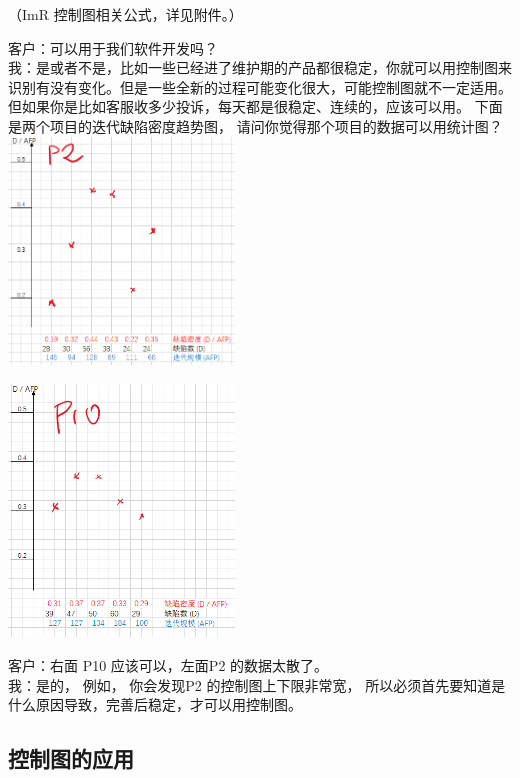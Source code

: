 （ImR 控制图相关公式，详见附件。）

客户：可以用于我们软件开发吗？\\
我：是或者不是，比如一些已经进了维护期的产品都很稳定，你就可以用控制图来识别有没有变化。但是一些全新的过程可能变化很大，可能控制图就不一定适用。但如果你是比如客服收多少投诉，每天都是很稳定、连续的，应该可以用。
下面是两个项目的迭代缺陷密度趋势图，
请问你觉得那个项目的数据可以用统计图？\\

\includegraphics[width=6cm]{P2CcScreenshot_2021-09-25_111304.png}

\includegraphics[width=6cm]{P10CcScreenshot_2021-09-25_104057.png}

客户：右面 P10 应该可以，左面P2 的数据太散了。\\
我：是的， 例如， 你会发现P2 的控制图上下限非常宽，
所以必须首先要知道是什么原因导致，完善后稳定，才可以用控制图。\\

\hypertarget{ux63a7ux5236ux56feux7684ux5e94ux7528}{%
\subsection{控制图的应用}\label{ux63a7ux5236ux56feux7684ux5e94ux7528}}


